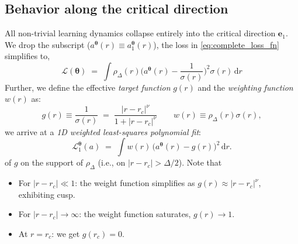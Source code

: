 \documentclass[11pt,a4paper]{article}
\theoremstyle{remark}
\newcommand{\btheta}{\boldsymbol{\theta}}
\newcommand{\be}{\mathbf{e}}
\newcommand{\rmd}{\textrm{d}}
\newcommand{\Th}{{\btheta}}
\begin{document}
\begin{onehalfspace}
\subsection{Behavior along the critical direction}\label{subsec:crit_behavior}
All non-trivial learning dynamics collapse entirely into the critical direction $\be_1$. We drop the subscript ($a^\Th(r)\equiv a^\Th_1(r)$), the loss in \eqref{eq:complete_loss_fn} simplifies to,
\begin{equation}
    \mathcal{L}(\Th) \;=\; \int \rho_{\Delta}(r)\bigg(a^\Th(r)- \frac{1}{\sigma(r)}\bigg)^2\sigma(r)\,\rmd r
    \label{eq:L1}
\end{equation}
Further, we define the effective \emph{target function} $g(r)$ and the \emph{weighting function} $w(r)$ as:
\begin{equation}
    g(r)\equiv \frac{1}{\sigma(r)} \;=\; \frac{|r - r_c|^\nu}{1 + |r - r_c|^\nu} \qquad w(r)\equiv \rho_{\Delta}(r)\sigma(r),
    \label{eq:gw}
\end{equation}
we arrive at a \emph{1D weighted least-squares polynomial fit}:
\begin{equation}
\mathcal{L}^\Th_1(a) \;=\; \int w(r)\, \big(a^\Th(r) - g(r)\big)^2\, \rmd r.
\label{eq:L1_compact}
\end{equation}
of $g$ on the support of $\rho_\Delta$ (i.e., on $|r-r_c| > \Delta/2$). Note that
\begin{itemize}
  \item For $|r-r_c| \ll 1$: the weight function simplifies as $g(r) \approx |r-r_c|^\nu$, exhibiting cusp.
  \item For $|r-r_c| \to \infty$: the weight function saturates, $g(r) \to 1$.
  \item At $r = r_c$: we get $g(r_c) = 0$.
\end{itemize}


\end{onehalfspace}
\end{document}
